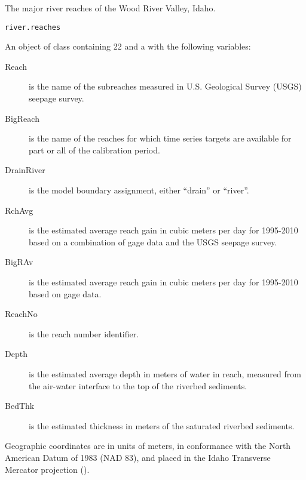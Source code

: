 \documentclass[letterpaper]{book}
\begin{document}
%
\begin{Examples}
\end{Examples}
%
\begin{Description}\relax
The major river reaches of the Wood River Valley, Idaho.
\end{Description}
%
\begin{Usage}
\begin{verbatim}
river.reaches
\end{verbatim}
\end{Usage}
%
\begin{Format}
An object of  class containing 22  and a  with the following variables:
\begin{description}

\item[Reach] is the name of the subreaches measured in U.S. Geological Survey (USGS) seepage survey.
\item[BigReach] is the name of the reaches for which time series targets are available for part or all of the calibration period.
\item[DrainRiver] is the model boundary assignment, either ``drain'' or ``river''.
\item[RchAvg] is the estimated average reach gain in cubic meters per day for 1995-2010 based on a combination of gage data and the USGS seepage survey.
\item[BigRAv] is the estimated average reach gain in cubic meters per day for 1995-2010 based on gage data.
\item[ReachNo] is the reach number identifier.
\item[Depth] is the estimated average depth in meters of water in reach, measured from the air-water interface to the top of the riverbed sediments.
\item[BedThk] is the estimated thickness in meters of the saturated riverbed sediments.

\end{description}

Geographic coordinates are in units of meters, in conformance with the North American Datum of 1983 (NAD 83), and placed in the
Idaho Transverse Mercator projection ().
\end{Format}
\end{document}
